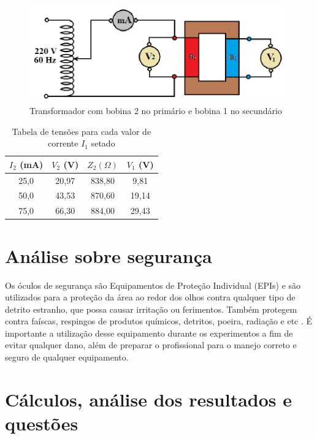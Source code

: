 \documentclass[a4paper,12pt,oneside,openany,table,xcdraw]{article}
\begin{document}
\begin{enumerate}[1)]
\begin{figure}[h]
\centering
\captionsetup{font=scriptsize}
\includegraphics[width=11cm]{fig5}
\caption{Transformador com bobina 2 no primário e bobina 1 no secundário}
\label{2.6}
\end{figure}
\begin{table}[h]
\centering
\def\arraystretch{1.35}
\captionsetup{type=table, font=scriptsize}
\caption{Tabela de tensões para cada valor de corrente $I_1$ setado} \label{tab4}
\begin{tabular}{|c|c|c|c|}
\hline
$I_2$ (mA) & $V_2$ (V)  & $Z_{2} (\Omega)$ & $V_1$ (V) \\ \hline
25,0          & 20,97  &  838,80       &  9,81     \\ \hline
50,0          & 43,53  &  870,60       &  19,14   \\ \hline
75,0          & 66,30  &  884,00       &  29,43   \\ \hline
\end{tabular}
\end{table}

\end{enumerate}

\section{Análise sobre segurança} %
Os óculos de segurança são Equipamentos de Proteção Individual (EPIs) e são utilizados para a proteção da área ao redor dos olhos contra qualquer tipo de detrito estranho, que possa causar irritação ou ferimentos. Também protegem contra faíscas, respingos de produtos químicos, detritos, poeira, radiação e etc \cite{safe}.
É importante a utilização desse equipamento durante os experimentos a fim de evitar qualquer dano, além de preparar o profissional para o manejo correto e seguro de qualquer equipamento.

\section{Cálculos, análise dos resultados e questões} %
\end{document}
